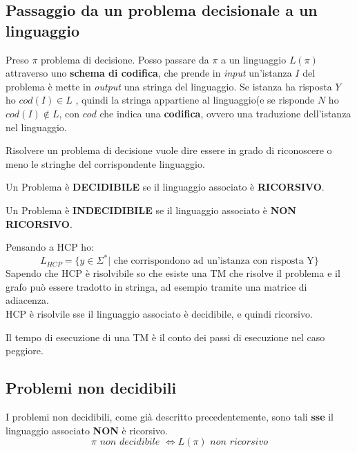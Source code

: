 \subsection{Passaggio da un problema decisionale a un linguaggio}
\begin{definizione}
  Preso $\pi$ problema di decisione. Posso passare da $\pi$ a un linguaggio
  $L(\pi)$ attraverso uno \textbf{schema di codifica}, che prende in \textit{input}
  un'istanza $I$ del problema è mette in \textit{output} una stringa del linguaggio. Se
  istanza ha risposta $Y$ ho $cod(I)\in L$ , quindi la stringa appartiene al linguaggio(e se risponde $N$ ho $cod(I)\not\in
  L$, con $cod$ che indica una 
  \textbf{codifica}, ovvero una traduzione dell'istanza nel linguaggio.\\
\end{definizione}
Risolvere un problema di decisione vuole dire essere in grado di riconoscere o meno le stringhe del corrispondente linguaggio.
\begin{definizione}
  Un Problema è \textbf{DECIDIBILE} se il linguaggio associato è \textbf{RICORSIVO}. 
\end{definizione}
\begin{definizione}
  Un Problema è \textbf{INDECIDIBILE} se il linguaggio associato è \textbf{NON RICORSIVO}. 
\end{definizione}
\begin{esempio}
  Pensando a HCP ho:
  \[L_{HCP}=\{y\in \Sigma^*|\mbox{ che corrispondono ad un'istanza con risposta
      Y}\}\]
  Sapendo che HCP è risolvibile so che esiste una TM che risolve il problema e
  il grafo può essere tradotto in stringa, ad esempio tramite una matrice di
  adiacenza.\\
  HCP è risolvile sse il linguaggio associato è decidibile, e quindi ricorsivo.
\end{esempio}
\begin{definizione}
  Il tempo di esecuzione di una TM è il conto dei passi di esecuzione nel caso
  peggiore.
\end{definizione}
\newpage
\subsection{Problemi non decidibili}
I problemi non decidibili, come già descritto precedentemente, sono tali \textbf{sse} il linguaggio associato \textbf{NON} è ricorsivo.
\[\pi \,\, non\,\,decidibile\,\, \iff L(\pi)\,\,non \,\,ricorsivo\]
